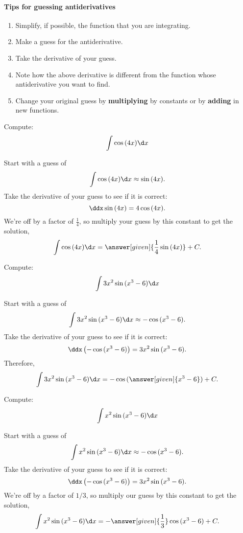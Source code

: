 \documentclass{ximera}
\begin{document}
\paragraph{Tips for guessing antiderivatives}
\begin{enumerate}
\item Simplify, if possible, the function that you are integrating.
\item Make a guess for the antiderivative.
\item Take the derivative of your guess.
\item Note how the above derivative is different from the function
  whose antiderivative you want to find.
\item Change your original guess by \textbf{multiplying} by constants
  or by \textbf{adding} in new functions.
\end{enumerate}
\begin{example}
  Compute:
  \[
  \int \cos{(4x)} \d x
  \]
  \begin{explanation}
   
   Start with a guess of 
    \[
    \int \cos{(4x)} \d x \approx \sin{(4x)}.
    \]
    Take the derivative of your guess to see if it is correct:
    \[
    \ddx  \sin{(4x)} = 4 \cos{(4x)}.
    \]
    We're off by a factor of $\frac{1}{4}$, so multiply your guess by this constant
    to get the solution,
    \[
  \int \cos{(4x)} \d x = \answer[given]{\frac{1}{4}\sin{(4x)}}+C.
    \]
\end{explanation}
\end{example}
\begin{example}
  Compute:
  \[
  \int 3x^2\sin{(x^3 -6)} \d x
  \]
  \begin{explanation}
    Start with a guess of 
    \[
 \int 3x^2\sin{(x^3 -6)} \d x \approx -\cos{(x^3 -6)}.
    \]
    Take the derivative of your guess to see if it is correct:
    \[
    \ddx \left(-\cos{(x^3 -6)}\right) = 3x^2\sin{(x^3 -6)}.
    \]
   Therefore,
    \[
    \int 3x^2\sin{(x^3 -6)} \d x
 =- \cos{(\answer[given]{x^3 -6})}+C.
    \]
\end{explanation}
\end{example}

\begin{example}
  Compute:
  \[
  \int x^2\sin{(x^3 -6)} \d x
  \]
  \begin{explanation}
    Start with a guess of 
    \[
 \int x^2\sin{(x^3 -6)} \d x \approx -\cos{(x^3 -6)}.
    \]
    Take the derivative of your guess to see if it is correct:
    \[
    \ddx \left(-\cos{(x^3 -6)}\right) = 3x^2\sin{(x^3 -6)}.
    \]
    We're off by a factor of $1/3$, so multiply our guess by this constant
    to get the solution,
    \[
    \int x^2\sin{(x^3 -6)} \d x
 =- \answer[given]{\frac{1}{3}}\cos{(x^3 -6)}+C.
    \]
\end{explanation}
\end{example}
\end{document}
